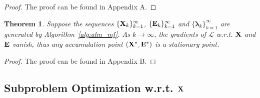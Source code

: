 \documentclass[letterpaper]{article} %
\newtheorem{theorem}{Theorem}
\newcommand\mycomment[1]{}
\def\calP{\mathcal{P}}
\def\bE{{\bf E}}
\def\blambda{{\bm \lambda}}
\def\calL{{\mathcal{L}}}
\def\bL{{\bf L}}
\def\bX{{\bf X}}
\def\bX{{\bf X}}
\begin{document}
\begin{proof}
  The proof can be found in Appendix A.
  \mycomment{
  By the optimality of $\bE_{t+1}$ in Step 2 in Algorithm~\ref{alg:alm_mf}, we have the sub-differential of $\calL$ w.r.t. $\bE$ as zeros:
  {\small
  \begin{align}
  \label{eq:derivatives_calL_E}
    0 & \in \frac{\calL(\bX_{t+1}, \bE_{t}, \blambda_{t}, \mu_{t})}{\bE_{t+1}} \nonumber \\
      & = \partial(|| \bE_{t+1} ||_{1,2}) + \blambda_{t} + \mu_{t} (\calP_{\Omega} (\bL - \bX_{t+1} - \bE_{t+1})) \nonumber \\
      & = \partial(|| \bE_{t+1} ||_{1,2}) + \blambda_{t+1}   \nonumber \\
    \Rightarrow & -\blambda_{t+1} \in \partial(|| \bE_{t+1} ||_{1,2})  .
  \end{align}
  }
  \noindent
  Consider the computation of $\bE_{t+1}$ in Eq~(\ref{eq:column_wise_soft_thresholding}), which is associated with $\bL, \bX_{t+1}$, $\blambda_{t}$ and $\mu_{t}$.
  $\bL$ is the observation and thus bounded.
  $\bX_{t+1}$ is bounded due to the convergence guarantee of Step 1 in Algorithm~\ref{alg:alm_mf}~\cite{vandereycken2013lowrank}.
  $\{ \blambda_{t} \}$ is initialized by setting $\blambda_{0} = 0$ and $\{ \mu_{t} \}$ is non-decreasing.
  Thus when updating by Algorithm~\ref{alg:alm_mf}, $\bE_{t+1}$, $\partial(\bE_{t+1})$ and $\blambda_{t}$ are all bounded accordingly as $t$ increases.
  This completes the proof.
  }
\end{proof}

\begin{theorem}
\label{theorem:alm_convergence}
  Suppose the sequences $\{\bX_k\}_{k=1}^{\infty}$, $\{\bE_k\}_{k=1}^{\infty}$ and $\{\blambda_k\}_{k=1}^{\infty}$ are generated by Algorithm~\ref{alg:alm_mf}.
  As $k \to \infty$, the gradients of $\calL$ w.r.t. $\bX$ and $\bE$ vanish,
  thus any accumulation point $(\bX^*, \bE^*)$ is a stationary point.
\end{theorem}

\begin{proof}
\label{proof:proof_AA}
  The proof can be found in Appendix B.
\end{proof}


\subsection{Subproblem Optimization w.r.t. $\bX$}
\label{sec:sub_x}
\end{document}
